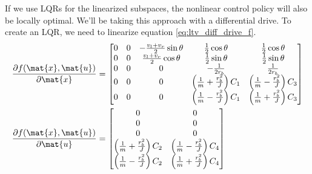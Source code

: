 If we use LQRs for the linearized subspaces, the nonlinear control policy will
also be locally optimal. We'll be taking this approach with a differential
drive. To create an LQR, we need to linearize equation
\eqref{eq:ltv_diff_drive_f}.
\begin{align*}
  \frac{\partial f(\mat{x}, \mat{u})}{\partial\mat{x}} &=
  \begin{bmatrix}
    0 & 0 & -\frac{v_l + v_r}{2}\sin\theta & \frac{1}{2}\cos\theta &
      \frac{1}{2}\cos\theta \\
    0 & 0 & \frac{v_l + v_r}{2}\cos\theta & \frac{1}{2}\sin\theta &
      \frac{1}{2}\sin\theta \\
    0 & 0 & 0 & -\frac{1}{2r_b} & \frac{1}{2r_b} \\
    0 & 0 & 0 & \left(\frac{1}{m} + \frac{r_b^2}{J}\right) C_1 &
      \left(\frac{1}{m} - \frac{r_b^2}{J}\right) C_3 \\
    0 & 0 & 0 & \left(\frac{1}{m} - \frac{r_b^2}{J}\right) C_1 &
      \left(\frac{1}{m} + \frac{r_b^2}{J}\right) C_3
  \end{bmatrix} \\
  \frac{\partial f(\mat{x}, \mat{u})}{\partial\mat{u}} &=
  \begin{bmatrix}
    0 & 0 \\
    0 & 0 \\
    0 & 0 \\
    \left(\frac{1}{m} + \frac{r_b^2}{J}\right) C_2 &
    \left(\frac{1}{m} - \frac{r_b^2}{J}\right) C_4 \\
    \left(\frac{1}{m} - \frac{r_b^2}{J}\right) C_2 &
    \left(\frac{1}{m} + \frac{r_b^2}{J}\right) C_4
  \end{bmatrix}
\end{align*}

